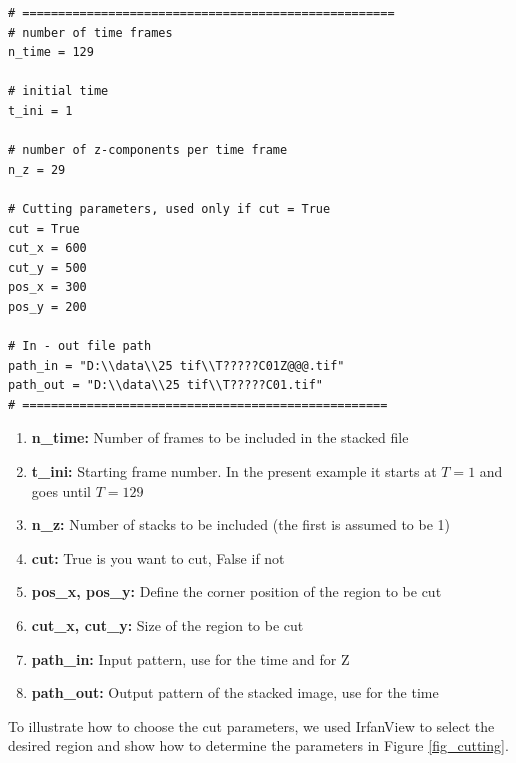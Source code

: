 \documentclass[12pt]{article}
\begin{document}
\begin{verbatim}
# ====================================================
# number of time frames
n_time = 129

# initial time
t_ini = 1

# number of z-components per time frame
n_z = 29

# Cutting parameters, used only if cut = True
cut = True
cut_x = 600 
cut_y = 500
pos_x = 300
pos_y = 200

# In - out file path
path_in = "D:\\data\\25 tif\\T?????C01Z@@@.tif"
path_out = "D:\\data\\25 tif\\T?????C01.tif"
# ===================================================
\end{verbatim}

\begin{enumerate}
\item{\textbf{n\_time:} Number of frames to be included in the stacked file}
\item{\textbf{t\_ini:} Starting frame number. In the present example it starts at $T=1$ and goes until $T=129$}
\item{\textbf{n\_z:} Number of stacks to be included (the first is assumed to be 1)}
\item{\textbf{cut:} True is you want to cut, False if not}
\item{\textbf{pos\_x, pos\_y:} Define the corner position of the region to be cut}
\item{\textbf{cut\_x, cut\_y:} Size of the region to be cut}
\item{\textbf{path\_in:} Input pattern, use  for the time and  for Z}
\item{\textbf{path\_out:}  Output pattern of the stacked image, use  for the time}
\end{enumerate}

To illustrate how to choose the cut parameters, we used IrfanView to select the desired region and show how to determine the parameters in Figure \ref{fig_cutting}.
\end{document}
